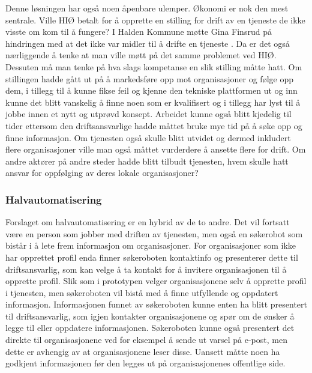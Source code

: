Denne løsningen har også noen åpenbare ulemper. Økonomi er nok den mest sentrale. Ville HIØ betalt for å opprette en stilling for drift av en tjeneste de ikke visste om kom til å fungere? I Halden Kommune møtte Gina Finsrud på hindringen med at det ikke var midler til å drifte en tjeneste \cite{KOMMUNEN-INTERVJU:20}. Da er det også nærliggende å tenke at man ville møtt på det samme problemet ved HIØ. Dessuten må man tenke på hva slags kompetanse en slik stilling måtte hatt. Om stillingen hadde gått ut på å markedsføre opp mot organisasjoner og følge opp dem, i tillegg til å kunne fikse feil og kjenne den tekniske plattformen ut og inn kunne det blitt vanskelig å finne noen som er kvalifisert og i tillegg har lyst til å jobbe innen et nytt og utprøvd konsept. Arbeidet kunne også blitt kjedelig til tider ettersom den driftsansvarlige hadde måttet bruke mye tid på å søke opp og finne informasjon. Om tjenesten også skulle blitt utvidet og dermed inkludert flere organisasjoner ville man også måttet vurderdere å ansette flere for drift. Om andre aktører på andre steder hadde blitt tilbudt tjenesten, hvem skulle hatt ansvar for oppfølging av deres lokale organisasjoner?

\subsubsection{Halvautomatisering}
Forslaget om halvautomatisering er en hybrid av de to andre. Det vil fortsatt være en person som jobber med driften av tjenesten, men også en søkerobot som bistår i å lete frem informasjon om organisasjoner. For organisasjoner som ikke har opprettet profil enda finner søkeroboten kontaktinfo og presenterer dette til driftsansvarlig, som kan velge å ta kontakt for å invitere organisasjonen til å opprette profil. Slik som i prototypen velger organisasjonene selv å opprette profil i tjenesten, men søkeroboten vil bistå med å finne utfyllende og oppdatert informasjon. Informasjonen funnet av søkeroboten kunne enten ha blitt presentert til driftsansvarlig, som igjen kontakter organisasjonene og spør om de ønsker å legge til eller oppdatere informasjonen. Søkeroboten kunne også presentert det direkte til organisasjonene ved for eksempel å sende ut varsel på e-post, men dette er avhengig av at organisasjonene leser disse. Uansett måtte noen ha godkjent informasjonen før den legges ut på organisasjonenes offentlige side.

